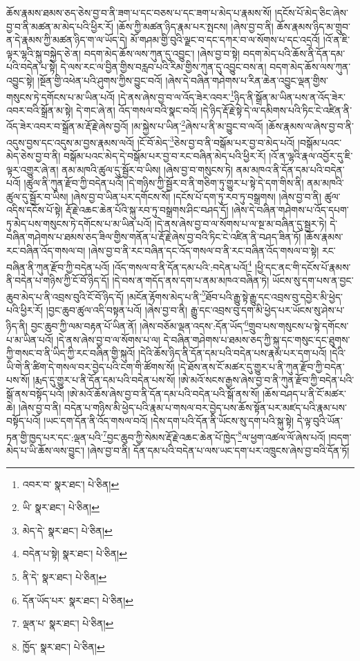 ཆོས་རྣམས་ཐམས་ཅད་ཅེས་བྱ་བ་ནི་ཟག་པ་དང་བཅས་པ་དང་ཟག་པ་མེད་པ་རྣམས་སོ། །དངོས་པོ་མེད་ཅིང་ཞེས་བྱ་བ་ནི་མཚན་མ་མེད་པའི་ཕྱིར་རོ། །ཆོས་ཀྱི་མཚན་ཉིད་རྣམ་པར་སྤངས། །ཞེས་བྱ་བ་ནི། ཆོས་རྣམས་ཉིད་མ་གྲུབ་ན་དེ་རྣམས་ཀྱི་མཚན་ཉིད་ག་ལ་ཡོད་དེ། མོ་གཤམ་གྱི་བུའི་ལྗང་བ་དང་དཀར་བ་ལ་སོགས་པ་དང་འདྲའོ། །འོ་ན་ཇི་ལྟར་ལྷའི་སྐུ་བསྐྱེད་ཅེ་ན། བདག་མེད་ཆོས་ལས་ཀུན་དུ་འབྱུང་། །ཞེས་བྱ་བ་སྟེ། བདག་མེད་པའི་ཆོས་ནི་དོན་དམ་པའི་བདེན་པ་སྟེ། དེ་ལས་རང་ལ་བྱིན་གྱིས་བརླབ་པའི་རིམ་གྱིས་ཀུན་དུ་འབྱུང་བས་ན། བདག་མེད་ཆོས་ལས་ཀུན་འབྱུང་སྟེ། །སྔོན་གྱི་འཕེན་པའི་ཤུགས་ཀྱིས་བྱུང་བའོ། །ཞེས་དེ་བཞིན་གཤེགས་པ་རིན་ཆེན་འབྱུང་ལྡན་གྱིས་གསུངས་ཏེ་དགོངས་པ་མ་ཡིན་པའོ། །དེ་ནས་ཞེས་བྱ་བ་ལ་འོད་ཟེར་འབར་\footnote{འབར་བ་  སྣར་ཐང་།  པེ་ཅིན། }ཉིད་ནི་སྒྲོན་མ་ཡིན་པས་ན་འོད་ཟེར་འབར་བའི་སྒྲོན་མ་སྟེ། དེ་གང་ཞེ་ན། འོད་གསལ་བའི་སྣང་བའོ། །དེ་ཉིད་རྡོ་རྗེ་སྟེ་དེ་ལ་དམིགས་པའི་ཏིང་ངེ་འཛིན་ནི་འོད་ཟེར་འབར་བ་སྒྲོན་མ་རྡོ་རྗེ་ཞེས་བྱའོ། །མ་སྐྱེས་པ་ཡིན་\footnote{ཡི་  སྣར་ཐང་།  པེ་ཅིན། }ཞེས་པ་ནི་མ་བྱུང་བ་ལའོ། །ཆོས་རྣམས་ལ་ཞེས་བྱ་བ་ནི་འདུས་བྱས་དང་འདུས་མ་བྱས་རྣམས་ལའོ། །ངོ་བོ་མེད་\footnote{མེད་དེ་  སྣར་ཐང་།  པེ་ཅིན། }ཅེས་བྱ་བ་ནི་བསྒོམ་པར་བྱ་བ་མེད་པའོ། །བསྒོམ་པའང་མེད་ཅེས་བྱ་བ་ནི། བསྒོམ་པའང་མེད་དེ་བསྒོམ་པར་བྱ་བ་རང་བཞིན་མེད་པའི་ཕྱིར་རོ། །འོ་ན་ལྷའི་རྣལ་འབྱོར་དུ་ཇི་ལྟར་འགྱུར་ཞེ་ན། ནམ་མཁའི་ཚུལ་དུ་སྦྱོར་བ་ཡིས། །ཞེས་བྱ་བ་གསུངས་ཏེ། ནམ་མཁའ་ནི་དོན་དམ་པའི་བདེན་པའོ། །ཚུལ་ནི་ཀུན་རྫོབ་ཀྱི་བདེན་པའོ། །དེ་གཉིས་ཀྱི་སྦྱོར་བ་ནི་གཅིག་ཏུ་གྱུར་པ་སྟེ་དེ་དག་གིས་ནི། ནམ་མཁའི་ཚུལ་དུ་སྦྱོར་བ་ཡིས། །ཞེས་བྱ་བ་ཡིན་པར་དགོངས་སོ། །དངོས་པོ་དག་ཏུ་རབ་ཏུ་བསྒྲགས། །ཞེས་བྱ་བ་ནི། ཚུལ་འདིས་དངོས་པོ་སྟེ། རྡོ་རྗེ་འཆང་ཆེན་པོའི་སྐུ་རབ་ཏུ་བསྒྲགས་ཤིང་བཤད་དོ། །ཞེས་དེ་བཞིན་གཤེགས་པ་འོད་དཔག་ཏུ་མེད་པས་གསུངས་ཏེ་དགོངས་པ་མ་ཡིན་པའོ། །དེ་ནས་ཞེས་བྱ་བ་ལ་སོགས་པ་ལ་སྔ་མ་བཞིན་དུ་སྦྱར་ཏེ། དེ་བཞིན་གཤེགས་པ་ཐམས་ཅད་ཟིལ་གྱིས་གནོན་པ་རྡོ་རྗེ་ཞེས་བྱ་བའི་ཏིང་ངེ་འཛིན་ནི་བཤད་ཟིན་ཏོ། །ཆོས་རྣམས་རང་བཞིན་འོད་གསལ་བ། །ཞེས་བྱ་བ་ནི་རང་བཞིན་དང་འོད་གསལ་བ་ནི་རང་བཞིན་འོད་གསལ་བ་སྟེ། རང་བཞིན་ནི་ཀུན་རྫོབ་ཀྱི་བདེན་པའོ། །འོད་གསལ་བ་ནི་དོན་དམ་པའི་:བདེན་པའོ།\footnote{བདེན་པ་སྟེ།  སྣར་ཐང་།  པེ་ཅིན། } །ཕྱི་དང་ནང་གི་དངོས་པོ་རྣམས་ནི་བདེན་པ་གཉིས་ཀྱི་ངོ་བོ་ཉིད་དོ། །དེ་བས་ན་གདོད་ནས་དག་པ་ནམ་མཁའ་བཞིན་ཏེ། ཡོངས་སུ་དག་པས་ན་བྱང་ཆུབ་མེད་པ་ནི་འབྲས་བུའི་ངོ་བོ་ཉིད་དོ། །མངོན་རྟོགས་མེད་པ་ནི་\footnote{ནི་དེ་  སྣར་ཐང་།  པེ་ཅིན། }ཐོབ་པའི་རྒྱུ་སྟེ་རྒྱུ་དང་འབྲས་བུ་དབྱེར་མི་ཕྱེད་པའི་ཕྱིར་རོ། །བྱང་ཆུབ་ཚུལ་འདི་བསྟན་པའོ། །ཞེས་བྱ་བ་ནི། རྒྱུ་དང་འབྲས་བུ་དག་མི་ཕྱེད་པར་ཡོངས་སུ་ཤེས་པ་ཉིད་ནི། བྱང་ཆུབ་ཀྱི་ལམ་བརྟན་པོ་ཡིན་ནོ། །ཞེས་བཅོམ་ལྡན་འདས་:དོན་ཡོད་\footnote{དོན་ཡོད་པར་  སྣར་ཐང་།  པེ་ཅིན། }གྲུབ་པས་གསུངས་པ་སྟེ་དགོངས་པ་མ་ཡིན་པའོ། །དེ་ནས་ཞེས་བྱ་བ་ལ་སོགས་པ་ལ། དེ་བཞིན་གཤེགས་པ་ཐམས་ཅད་ཀྱི་སྐུ་དང་གསུང་དང་ཐུགས་ཀྱི་གསང་བ་ནི་ཡིད་ཀྱི་རང་བཞིན་གྱི་སྐུའོ། །དེའི་ཆོས་ཉིད་ནི་དོན་དམ་པའི་བདེན་པས་རྣམ་པར་དག་པའོ། །དེའི་ཡི་གེ་ནི་ཚིག་དེ་གསལ་བར་བྱེད་པའི་ངག་གི་ཚོགས་སོ། །དེ་ཐོས་ནས་ངོ་མཚར་དུ་གྱུར་པ་ནི་ཀུན་རྫོབ་ཀྱི་བདེན་པས་སོ། །རྨད་དུ་གྱུར་པ་ནི་དོན་དམ་པའི་བདེན་པས་སོ། །ཨེ་མའོ་སངས་རྒྱས་ཞེས་བྱ་བ་ནི་ཀུན་རྫོབ་ཀྱི་བདེན་པའི་སྒོ་ནས་བསྟོད་པའོ། །ཨེ་མའོ་ཆོས་ཞེས་བྱ་བ་ནི་དོན་དམ་པའི་བདེན་པའི་སྒོ་ནས་སོ། །ཆོས་བཤད་པ་ནི་ངོ་མཚར་ཆེ། །ཞེས་བྱ་བ་ནི། བདེན་པ་གཉིས་མི་ཕྱེད་པའི་རྣམ་པ་གསལ་བར་བྱེད་པས་ཆོས་སྟོན་པར་མཛད་པའི་རྣམ་པས་བསྟོད་པའོ། །ཡང་དག་དོན་ནི་འོད་གསལ་བའོ། །དེས་དག་པའི་དོན་ནི་ཡོངས་སུ་དག་པའི་སྐུ་སྟེ། དེ་ལྟ་བུའི་ཡོན་ཏན་གྱི་ཁྱད་པར་དང་:ལྡན་པའི་\footnote{ལྡན་པ་  སྣར་ཐང་།  པེ་ཅིན། }བྱང་ཆུབ་ཀྱི་སེམས་རྡོ་རྗེ་འཆང་ཆེན་པོ་ཁྱེད་\footnote{ཁྱོད་  སྣར་ཐང་།  པེ་ཅིན། }ལ་ཕྱག་འཚལ་ལོ་ཞེས་པའོ། །བདག་མེད་པ་ཡི་ཆོས་ལས་བྱུང་། །ཞེས་བྱ་བ་ནི། དོན་དམ་པའི་བདེན་པ་ལས་ཡང་དག་པར་འཁྲུངས་ཞེས་བྱ་བའི་དོན་ཏོ། 